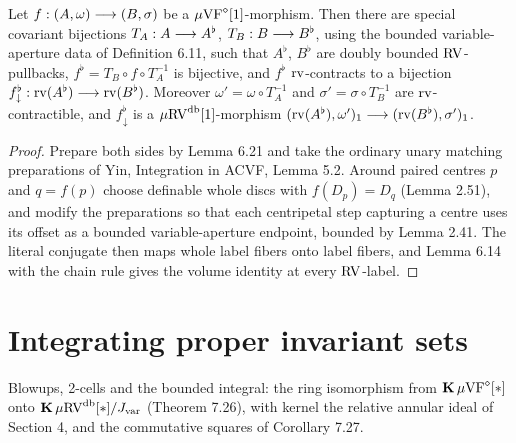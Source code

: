 \setcounter{theorem}{37}
\begin{lemma}
\label{simul-special-dim-1}
\leanok
{}
Let $f:(A,\omega)\longrightarrow(B,\sigma)$ be a $\mu\mathrm{VF}^{\diamond}[1]$-morphism. Then there are special covariant bijections $T_A:A\longrightarrow A^\flat$, $T_B:B\longrightarrow B^\flat$, using the bounded variable-aperture data of Definition 6.11, such that $A^\flat$, $B^\flat$ are doubly bounded $\mathrm{RV}$-pullbacks, $f^\flat=T_B\circ f\circ T_A^{-1}$ is bijective, and $f^\flat$ $\operatorname{rv}$-contracts to a bijection $f^\flat_\downarrow:\operatorname{rv}(A^\flat)\longrightarrow\operatorname{rv}(B^\flat)$. Moreover $\omega'=\omega\circ T_A^{-1}$ and $\sigma'=\sigma\circ T_B^{-1}$ are $\operatorname{rv}$-contractible, and $f^\flat_\downarrow$ is a $\mu\mathrm{RV}^{\operatorname{db}}[1]$-morphism $(\operatorname{rv}(A^\flat),\omega')_1\longrightarrow(\operatorname{rv}(B^\flat),\sigma')_1$.
\end{lemma}

\begin{proof}
\leanok
Prepare both sides by Lemma 6.21 and take the ordinary unary matching preparations of Yin, Integration in ACVF, Lemma 5.2. Around paired centres $p$ and $q=f(p)$ choose definable whole discs with $f(D_p)=D_q$ (Lemma 2.51), and modify the preparations so that each centripetal step capturing a centre uses its offset as a bounded variable-aperture endpoint, bounded by Lemma 2.41. The literal conjugate then maps whole label fibers onto label fibers, and Lemma 6.14 with the chain rule gives the volume identity at every $\mathrm{RV}$-label.
\end{proof}

\section{Integrating proper invariant sets}
\label{section-7}
Blowups, 2-cells and the bounded integral: the ring isomorphism from $\operatorname{\mathbf{K}}\mu\mathrm{VF}^{\diamond}[*]$ onto $\operatorname{\mathbf{K}}\mu\mathrm{RV}^{\operatorname{db}}[*]/J_{\mathrm{var}}$ (Theorem 7.26), with kernel the relative annular ideal of Section 4, and the commutative squares of Corollary 7.27.

